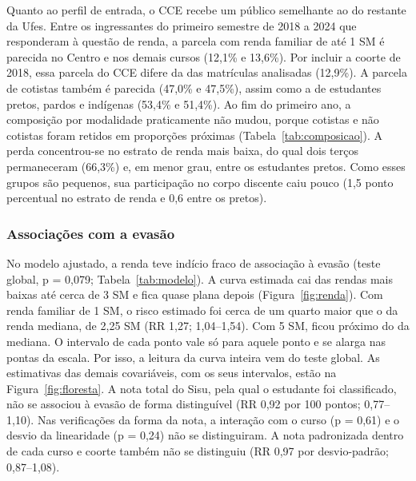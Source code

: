 \documentclass[12pt,a4paper]{article}
\newcommand{\tabela}[1]{\sbox\caixatabela{}%
  \ifdim\wd\caixatabela>\linewidth \resizebox{\linewidth}{!}{\usebox\caixatabela}%
  \else\ifdim\dimexpr\ht\caixatabela+\dp\caixatabela\relax>0.80\textheight
    \resizebox*{!}{0.80\textheight}{\usebox\caixatabela}%
  \else\usebox\caixatabela\fi\fi}
\begin{document}
Quanto ao perfil de entrada, o CCE recebe um público semelhante ao do restante da Ufes. Entre os ingressantes do primeiro semestre de 2018 a 2024 que responderam à questão de renda, a parcela com renda familiar de até 1 SM é parecida no Centro e nos demais cursos (12,1\% e 13,6\%). Por incluir a coorte de 2018, essa parcela do CCE difere da das matrículas analisadas (12,9\%). A parcela de cotistas também é parecida (47,0\% e 47,5\%), assim como a de estudantes pretos, pardos e indígenas (53,4\% e 51,4\%). Ao fim do primeiro ano, a composição por modalidade praticamente não mudou, porque cotistas e não cotistas foram retidos em proporções próximas (Tabela~\ref{tab:composicao}). A perda concentrou-se no estrato de renda mais baixa, do qual dois terços permaneceram (66,3\%) e, em menor grau, entre os estudantes pretos. Como esses grupos são pequenos, sua participação no corpo discente caiu pouco (1,5 ponto percentual no estrato de renda e 0,6 entre os pretos).

\begin{table}[H]
  \centering
  \caption[Composição do corpo discente no ingresso e após o primeiro ano]{Composição do corpo discente no ingresso e após o primeiro ano, e
  retenção no primeiro ano. Percentuais calculados entre os ingressantes com a
  informação disponível.}
  \label{tab:composicao}
  \tabela{tab_art_composicao.tex}
\end{table}

\subsubsection{Associações com a evasão}
\label{sec:res-modelo}

No modelo ajustado, a renda teve indício fraco de associação à evasão (teste global, p = 0,079; Tabela~\ref{tab:modelo}). A curva estimada cai das rendas mais baixas até cerca de 3 SM e fica quase plana depois (Figura~\ref{fig:renda}). Com renda familiar de 1 SM, o risco estimado foi cerca de um quarto maior que o da renda mediana, de 2,25 SM (RR 1,27; 1,04–1,54). Com 5 SM, ficou próximo do da mediana. O intervalo de cada ponto vale só para aquele ponto e se alarga nas pontas da escala. Por isso, a leitura da curva inteira vem do teste global. As estimativas das demais covariáveis, com os seus intervalos, estão na Figura~\ref{fig:floresta}. A nota total do Sisu, pela qual o estudante foi classificado, não se associou à evasão de forma distinguível (RR 0,92 por 100 pontos; 0,77–1,10). Nas verificações da forma da nota, a interação com o curso (p = 0,61) e o desvio da linearidade (p = 0,24) não se distinguiram. A nota padronizada dentro de cada curso e coorte também não se distinguiu (RR 0,97 por desvio-padrão; 0,87–1,08).
\end{document}
